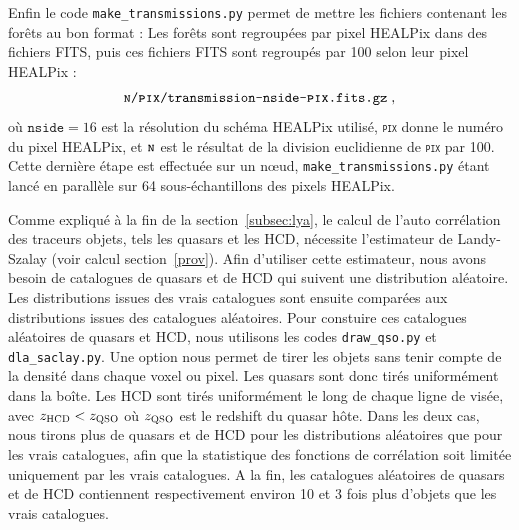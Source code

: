 \documentclass[11pt, twoside, a4paper, openright]{report}
\begin{document}
Enfin le code \texttt{make\_transmissions.py} permet de mettre les fichiers contenant les forêts au bon format :
Les forêts sont regroupées par pixel HEALPix \autocite{Gorski2004} dans des fichiers FITS, puis ces fichiers FITS sont regroupés par 100 selon leur pixel HEALPix :
\begin{equation*}
  \texttt{\textsc{n}/\textsc{pix}/transmission-nside-\textsc{pix}.fits.gz} \; ,
\end{equation*}
où $\texttt{nside} = \num{16}$ est la résolution du schéma HEALPix utilisé, \texttt{\textsc{pix}} donne le numéro du pixel HEALPix, et $\texttt{\textsc{n}}$ est le résultat de la division euclidienne de \texttt{\textsc{pix}} par \num{100}.
Cette dernière étape est effectuée sur un n{\oe}ud, \texttt{make\_transmissions.py} étant lancé en parallèle sur 64 sous-échantillons des pixels HEALPix.

Comme expliqué à la fin de la section~\ref{subsec:lya}, le calcul de l'auto corrélation des traceurs objets, tels les quasars et les HCD, nécessite l'estimateur de Landy-Szalay (voir calcul section~\ref{prov}). Afin d'utiliser cette estimateur, nous avons besoin de catalogues de quasars et de HCD qui suivent une distribution aléatoire.
Les distributions issues des vrais catalogues sont ensuite comparées aux distributions issues des catalogues aléatoires.
Pour constuire ces catalogues aléatoires de quasars et HCD, nous utilisons les codes \texttt{draw\_qso.py} et \texttt{dla\_saclay.py}. Une option nous permet de tirer les objets sans tenir compte de la densité dans chaque voxel ou pixel. Les quasars sont donc tirés uniformément dans la boîte. Les HCD sont tirés uniformément le long de chaque ligne de visée, avec $z_{\textsc{HCD}} < z_{\textsc{QSO}}$ où $z_{\textsc{QSO}}$ est le redshift du quasar hôte. Dans les deux cas, nous tirons plus de quasars et de HCD pour les distributions aléatoires que pour les vrais catalogues, afin que la statistique des fonctions de corrélation soit limitée uniquement par les vrais catalogues. A la fin, les catalogues aléatoires de quasars et de HCD contiennent respectivement environ 10 et 3 fois plus d'objets que les vrais catalogues.
\end{document}
